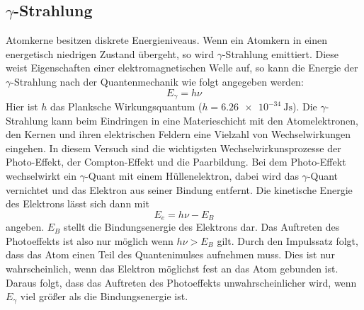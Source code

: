 \subsection{\texorpdfstring{$\gamma$}{Gamma}-Strahlung}
Atomkerne besitzen diskrete Energieniveaus.
Wenn ein Atomkern in einen energetisch niedrigen Zustand übergeht, so wird $\gamma$-Strahlung emittiert.
Diese weist Eigenschaften einer elektromagnetischen Welle auf, so kann die Energie der $\gamma$-Strahlung
nach der Quantenmechanik wie folgt angegeben werden:
\begin{equation}
  E_\gamma = h\nu
\end{equation}
Hier ist $h$ das Planksche Wirkungsquantum ($h=\SI{6.26e-34}{\joule\second}$\cite{planck}).
Die $\gamma$-Strahlung kann beim Eindringen in eine Materieschicht mit den Atomelektronen, den Kernen und ihren elektrischen Feldern eine Vielzahl von Wechselwirkungen eingehen.
In diesem Versuch sind die wichtigsten Wechselwirkunsprozesse der Photo-Effekt, der Compton-Effekt und die Paarbildung.
Bei dem Photo-Effekt wechselwirkt ein $\gamma$-Quant mit einem Hüllenelektron, dabei wird das $\gamma$-Quant vernichtet und das Elektron aus seiner Bindung entfernt.
Die kinetische Energie des Elektrons lässt sich dann mit
\begin{equation}
  E_e = h\nu - E_B
\end{equation}
angeben.
$E_B$ stellt die Bindungsenergie des Elektrons dar.
Das Auftreten des Photoeffekts ist also nur möglich wenn $h\nu > E_B$ gilt.
Durch den Impulssatz folgt, dass das Atom einen Teil des Quantenimulses aufnehmen muss.
Dies ist nur wahrscheinlich, wenn das Elektron möglichst fest an das Atom gebunden ist.
Daraus folgt, dass das Auftreten des Photoeffekts unwahrscheinlicher wird, wenn $E_\gamma$  viel größer als die Bindungsenergie ist.


